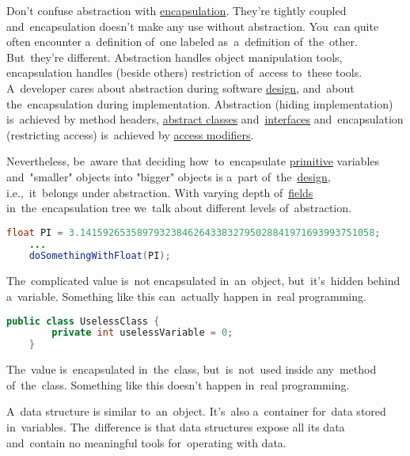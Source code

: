 \warning Don't confuse abstraction with \hyperref[encapsulation]{encapsulation}.
They're tightly coupled and~encapsulation doesn't make any use without abstraction.
You~can quite often encounter a~definition of~one labeled as~a~definition of~the~other.
But~they're different.
Abstraction handles object manipulation tools, encapsulation handles (beside others) restriction of~access to~these tools.
A~developer cares about abstraction during software \hyperref[architecturedesign]{design}, and~about the~encapsulation during implementation.
Abstraction (hiding implementation) is~achieved by method headers, \hyperref[javaabstractclasses]{abstract classes} and~\hyperref[javainterfaces]{interfaces} and~encapsulation (restricting access) is~achieved by \hyperref[javaaccessmodifiers]{access modifiers}.

Nevertheless, be~aware that deciding how~to~encapsulate \hyperref[javadatatypes]{primitive} variables and~"smaller" objects into "bigger" objects is a~part of~the~\hyperref[architecturedesign]{design}, i.e.,~it~belongs under abstraction.
With varying depth of~\hyperref[variablefieldproperty]{fields} in~the~encapsulation tree we~talk about different levels of~abstraction.

\begin{lstlisting}[language=Java]
    float PI = 3.1415926535897932384626433832795028841971693993751058;
    ...
    doSomethingWithFloat(PI);
\end{lstlisting}

\noindent The~complicated value is~not encapsulated in~an~object, but~it's~hidden behind a~variable.
Something like this can~actually happen in~real programming.

\begin{lstlisting}[language=Java]
    public class UselessClass {
        private int uselessVariable = 0;
    }
\end{lstlisting}

\noindent The~value is~encapsulated in~the~class, but~is~not~used inside any~method of~the~class.
Something like this doesn't happen in~real programming.
\newline

\label{objectdatastructure}
A~data structure is similar to~an~object.
It's~also a~container for~data stored in~variables.
The~difference is that data structures expose all its data and~contain no meaningful tools for~operating with data.

